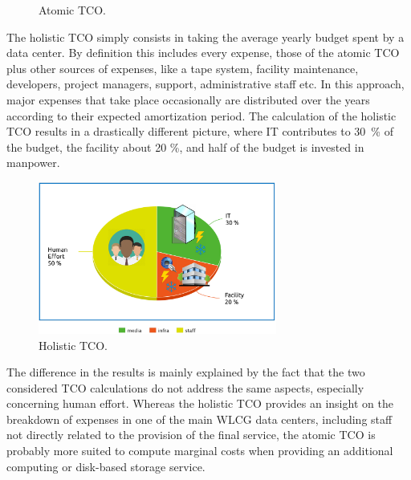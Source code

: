 \begin{figure}[h]
    \caption{Atomic TCO.}
    \label{fig:tco:atomic}
\end{figure}



The holistic TCO simply consists in taking the average yearly budget spent by a data center.
By definition this includes every expense, those of the atomic TCO plus other sources of expenses, like a tape system,
facility maintenance, developers, project managers, support, administrative staff etc.
In this approach, major expenses that take place occasionally
are distributed over the years according to their expected amortization period.
The calculation of the holistic TCO results in a drastically different picture,
where IT contributes to 30~\% of the budget, the facility about 20 \%, and half of the budget is invested in manpower.

\begin{figure}[h]
    \centering
    \includegraphics[height=5cm]{holistic_tco.png}
    \caption{Holistic TCO.}
    \label{fig:tco:holistic}
\end{figure}


The difference in the results is mainly explained by the fact that the two considered TCO calculations do not address
the same aspects, especially concerning human effort. Whereas the holistic TCO provides an insight on the breakdown
of expenses in one of the main WLCG data centers, including staff not directly related to the provision of the final service,
the atomic TCO is probably more suited to compute marginal costs when
providing an additional computing or disk-based storage service.



